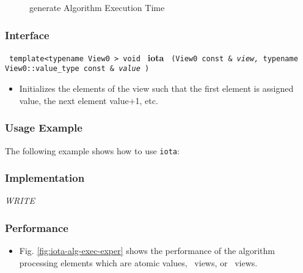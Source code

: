 \begin{figure}[p]
\caption{generate Algorithm Execution Time}
\label{fig:gener-alg-exec-exper}
\end{figure}

 
\subsubsection{Interface} %

\noindent
\texttt{%
template<typename View0 >
\newline
void 
}
\newline
\textbf{iota}%
\texttt{%
(View0 const \&
\textit{view,}%
typename View0::value\_type const \&
\textit{value}%
)
}

\begin{itemize}
\item
Initializes the elements of the view such that the first element is assigned value, the next element value+1, etc. 
\end{itemize}
 
\subsubsection{Usage Example} %

The following example shows how to use \texttt{iota}:

 
\subsubsection{Implementation} %

\textit{WRITE}

\subsubsection{Performance} %

\begin{itemize}
\item
Fig. \ref{fig:iota-alg-exec-exper}
shows the performance of the algorithm processing
elements which are atomic values, \stl\ views, or \stapl\ views.
\end{itemize}

